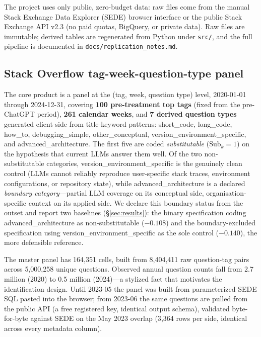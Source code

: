 The project uses only public, zero-budget data: raw files come
from the manual Stack Exchange Data Explorer (SEDE) browser
interface or the public Stack Exchange API v2.3 (no paid quotas,
BigQuery, or private data). Raw files are immutable; derived
tables are regenerated from Python under \texttt{src/}, and the
full pipeline is documented in \texttt{docs/replication\_notes.md}.

\subsection{Stack Overflow tag-week-question-type panel}

The core product is a panel at the (tag, week, question type)
level, 2020-01-01 through 2024-12-31, covering \textbf{100
pre-treatment top tags} (fixed from the pre-ChatGPT period),
\textbf{261 calendar weeks}, and \textbf{7 derived question
types} generated client-side from title-keyword patterns:
short\_code, long\_code, how\_to, debugging\_simple,
other\_conceptual, version\_environment\_specific, and
advanced\_architecture. The first five are coded
\emph{substitutable} ($\text{Sub}_k=1$) on the hypothesis that
current LLMs answer them well. Of the two non-substitutable
categories, version\_environment\_specific is the genuinely
clean control (LLMs cannot reliably reproduce user-specific
stack traces, environment configurations, or repository state),
while advanced\_architecture is a declared \emph{boundary
category}---partial LLM coverage on its conceptual side,
organisation-specific context on its applied side. We declare
this boundary status from the outset and report two baselines
(\S\ref{sec:results}): the binary specification coding
advanced\_architecture as non-substitutable ($-0.108$) and the
boundary-excluded specification using
version\_environment\_specific as the sole control ($-0.140$),
the more defensible reference.

The master panel has 164{,}351 cells, built from 8{,}404{,}411
raw question-tag pairs across 5{,}000{,}258 unique questions.
Observed annual question counts fall from 2.7 million (2020) to
0.5 million (2024)---a stylized fact that motivates the
identification design. Until 2023-05 the panel was built from
parameterized SEDE SQL pasted into the browser; from 2023-06 the
same questions are pulled from the public API (a free registered
key, identical output schema), validated byte-for-byte against
SEDE on the May 2023 overlap (3{,}364 rows per side, identical
across every metadata column).

